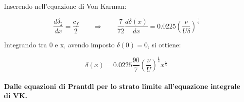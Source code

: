 Inserendo nell'equazione di Von Karman:

\begin{equation}
 \frac{d \delta_2}{dx}  = \frac{c_f}{2} \qquad\Rightarrow \qquad
  \frac{7}{72}\frac{d \delta(x)}{d x} = 0.0225 \displaystyle \left( \frac{\nu}{U \delta} \right)^{\frac{1}{4}}
\end{equation}

Integrando tra 0 e x, avendo imposto $\delta(0) = 0$, si ottiene:

\begin{equation}
  \delta(x) = 0.0225 \frac{90}{7} \displaystyle \left( \frac{\nu}{U } \right)^{\frac{1}{4}} x^{\frac{4}{5}}
\end{equation}

\vspace{3.0cm}
\paragraph{Dalle equazioni di Prantdl per lo strato limite all'equazione integrale di VK.} 

